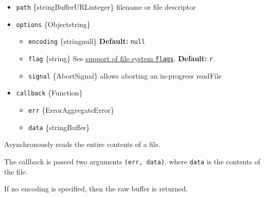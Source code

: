 \begin{itemize}
\tightlist
\item
  \texttt{path} \{string\textbar Buffer\textbar URL\textbar integer\}
  filename or file descriptor
\item
  \texttt{options} \{Object\textbar string\}

  \begin{itemize}
  \tightlist
  \item
    \texttt{encoding} \{string\textbar null\} \textbf{Default:}
    \texttt{null}
  \item
    \texttt{flag} \{string\} See \hyperref[file-system-flags]{support of
    file system \texttt{flags}}. \textbf{Default:}
    \texttt{\textquotesingle{}r\textquotesingle{}}.
  \item
    \texttt{signal} \{AbortSignal\} allows aborting an in-progress
    readFile
  \end{itemize}
\item
  \texttt{callback} \{Function\}

  \begin{itemize}
  \tightlist
  \item
    \texttt{err} \{Error\textbar AggregateError\}
  \item
    \texttt{data} \{string\textbar Buffer\}
  \end{itemize}
\end{itemize}

Asynchronously reads the entire contents of a file.

\begin{Shaded}
\begin{Highlighting}[]
 \OperatorTok{;}

\NormalTok{(}\OperatorTok{,}\OperatorTok{,}\KeywordTok{=\textgreater{}}\NormalTok{ \{}
  \OperatorTok{;}
  \OperatorTok{;}
\NormalTok{\})}\OperatorTok{;}
\end{Highlighting}
\end{Shaded}

The callback is passed two arguments \texttt{(err,\ data)}, where
\texttt{data} is the contents of the file.

If no encoding is specified, then the raw buffer is returned.

